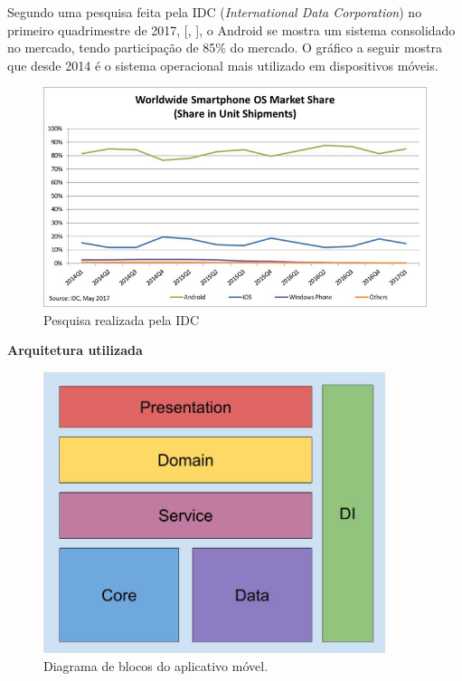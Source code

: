 \documentclass[
	12pt,				%
	oneside,			%
	a4paper,			%
	brazil				%
]{abntex2}
\newcommand{\citecustom}[1]{[\citeauthoronline{#1}, \citeyear{#1}]}
\begin{document}
{Segundo uma pesquisa feita pela IDC (\textit{International Data Corporation}) no primeiro quadrimestre de 2017, \citecustom{idc}, o Android se mostra um sistema consolidado no mercado, tendo participação de 85\% do mercado. O gráfico a seguir mostra que desde 2014 é o sistema operacional mais utilizado em dispositivos móveis.

\begin{figure}[H]
\centering
\includegraphics[width=15cm, center]{images/smartphone-share-market.jpg}
\caption{Pesquisa realizada pela IDC}
\label{Rotulo}
\end{figure}

\newpage

\textbf{Arquitetura utilizada}

\begin{figure}[H]
\centering
\includegraphics[width=10cm, center]{images/brick_diagram_beacon}
\caption{Diagrama de blocos do aplicativo móvel.}
\label{Rotulo}
\end{figure}

}
\end{document}
